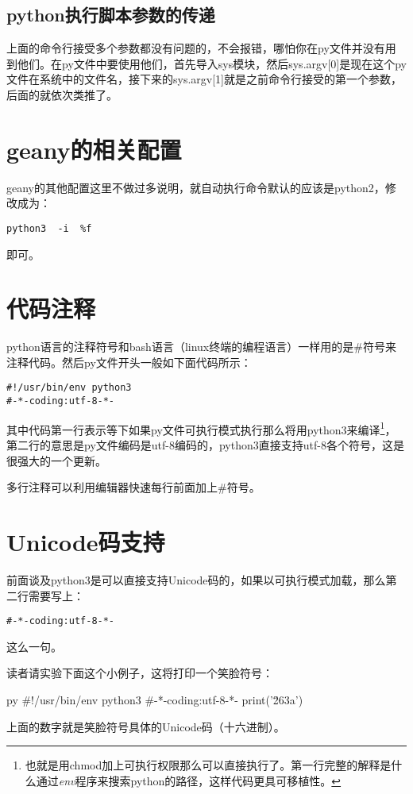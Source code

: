 \documentclass[12pt,oneside]{book}
\begin{document}
\begin{common-format}
\subsection{python执行脚本参数的传递}
上面的命令行接受多个参数都没有问题的，不会报错，哪怕你在py文件并没有用到他们。在py文件中要使用他们，首先导入sys模块，然后sys.argv[0]是现在这个py文件在系统中的文件名，接下来的sys.argv[1]就是之前命令行接受的第一个参数，后面的就依次类推了。


\section{geany的相关配置}
geany的其他配置这里不做过多说明，就自动执行命令默认的应该是python2，修改成为：
\begin{Verbatim}
python3  -i  %f  
\end{Verbatim}
即可。


\section{代码注释}
python语言的注释符号和bash语言（linux终端的编程语言）一样用的是\#{}符号来注释代码。然后py文件开头一般如下面代码所示：
\begin{Verbatim}
#!/usr/bin/env python3
#-*-coding:utf-8-*-
\end{Verbatim}
其中代码第一行表示等下如果py文件可执行模式执行那么将用python3来编译\footnote{也就是用chmod加上可执行权限那么可以直接执行了。第一行完整的解释是什么通过\textit{env}程序来搜索python的路径，这样代码更具可移植性。}，第二行的意思是py文件编码是utf-8编码的，python3直接支持utf-8各个符号，这是很强大的一个更新。

多行注释可以利用编辑器快速每行前面加上\#{}符号。

\section{Unicode码支持}
前面谈及python3是可以直接支持Unicode码的，如果以可执行模式加载，那么第二行需要写上：
\begin{Verbatim}
#-*-coding:utf-8-*-
\end{Verbatim}
这么一句。

读者请实验下面这个小例子，这将打印一个笑脸符号：
\begin{xverbatim}[129]{py}
#!/usr/bin/env python3
#-*-coding:utf-8-*-
print('\u263a')
\end{xverbatim}

上面的数字就是笑脸符号具体的Unicode码（十六进制）。



\end{common-format}
\end{document}

